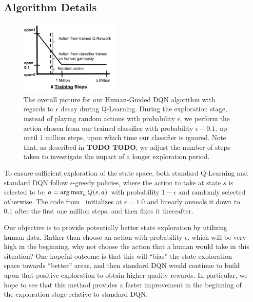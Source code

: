 \documentclass[letterpaper, 10pt, conference]{ieeeconf}
\begin{document}
\subsection{Algorithm Details}\label{ssec:algorithm}

\begin{figure}[t]
\centering
\includegraphics[width=0.45\textwidth]{figures/dqn_with_human_data_graph.png}
\caption{\footnotesize
The overall picture for our Human-Guided DQN algorithm with regards to
$\epsilon$ decay during Q-Learning. During the exploration stage, instead of
playing random actions with probability $\epsilon$, we perform the action chosen
from our trained classifier with probability $\epsilon-0.1$, up until 1 million
steps, upon which time our classifier is ignored. Note that, as described in
\textbf{TODO TODO}, we adjust the number of steps taken to investigate the
impact of a longer exploration period.
}
\label{fig:human-guided-dqn}
\end{figure}

To ensure sufficient exploration of the state space, both standard Q-Learning
and standard DQN follow $\epsilon$-greedy policies, where the action to take at
state $s$ is selected to be $a = \operatorname*{arg\,max}_a Q(s,a)$ with probability $1-\epsilon$
and randomly selected otherwise. The code from~\cite{mnih-dqn-2015} initializes
at $\epsilon=1.0$ and linearly anneals it down to 0.1 after the first one
million steps, and then fixes it thereafter.

Our objective is to provide potentially better state exploration by utilizing
human data. Rather than choose an action with probability $\epsilon$, which will
be very high in the beginning, why not choose the action that a human would take
in this situation? One hopeful outcome is that this will ``bias'' the state
exploration space towards ``better'' areas, and then standard DQN would continue
to build upon that positive exploration to obtain higher-quality rewards. In
particular, we hope to see that this method provides a faster improvement in the
beginning of the exploration stage relative to standard DQN.
\end{document}
